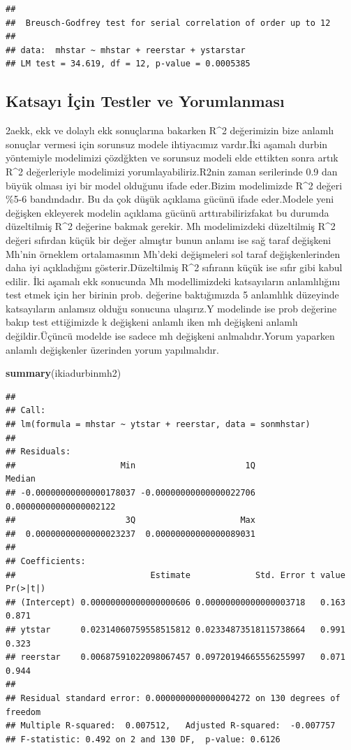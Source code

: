 \documentclass[]{article}
\newenvironment{Shaded}{\begin{snugshade}}{\end{snugshade}}
\newcommand{\KeywordTok}[1]{\textcolor[rgb]{0.13,0.29,0.53}{\textbf{#1}}}
\newcommand{\NormalTok}[1]{#1}
\begin{document}
\begin{verbatim}
## 
##  Breusch-Godfrey test for serial correlation of order up to 12
## 
## data:  mhstar ~ mhstar + reerstar + ystarstar
## LM test = 34.619, df = 12, p-value = 0.0005385
\end{verbatim}

\subsection{Katsayı İçin Testler ve
Yorumlanması}\label{katsay-icin-testler-ve-yorumlanmas}

2aekk, ekk ve dolaylı ekk sonuçlarına bakarken R\^{}2 değerimizin bize
anlamlı sonuçlar vermesi için sorunsuz modele ihtiyacımız vardır.İki
aşamalı durbin yöntemiyle modelimizi çözdğkten ve sorunsuz modeli elde
ettikten sonra artık R\^{}2 değerleriyle modelimizi
yorumlayabiliriz.R2nin zaman serilerinde 0.9 dan büyük olması iyi bir
model olduğunu ifade eder.Bizim modelimizde R\^{}2 değeri \%5-6
bandındadır. Bu da çok düşük açıklama gücünü ifade eder.Modele yeni
değişken ekleyerek modelin açıklama gücünü arttırabilirizfakat bu
durumda düzeltilmiş R\^{}2 değerine bakmak gerekir. Mh modelimizdeki
düzeltilmiş R\^{}2 değeri sıfırdan küçük bir değer almıştır bunun anlamı
ise sağ taraf değişkeni Mh'nin örneklem ortalamasının Mh'deki
değişmeleri sol taraf değişkenlerinden daha iyi açıkladığını
gösterir.Düzeltilmiş R\^{}2 sıfırann küçük ise sıfır gibi kabul edilir.
İki aşamalı ekk sonucunda Mh modellimizdeki katsayıların anlamlılığını
test etmek için her birinin prob. değerine baktığımızda 5 anlamlılık
düzeyinde katsayıların anlamsız olduğu sonucuna ulaşırız.Y modelinde ise
prob değerine bakıp test ettiğimizde k değişkeni anlamlı iken mh
değişkeni anlamlı değildir.Üçüncü modelde ise sadece mh değişkeni
anlmalıdır.Yorum yaparken anlamlı değişkenler üzerinden yorum
yapılmalıdır.

\begin{Shaded}
\begin{Highlighting}[]
\KeywordTok{summary}\NormalTok{(ikiadurbinmh2)}
\end{Highlighting}
\end{Shaded}

\begin{verbatim}
## 
## Call:
## lm(formula = mhstar ~ ytstar + reerstar, data = sonmhstar)
## 
## Residuals:
##                     Min                      1Q                  Median 
## -0.00000000000000178037 -0.00000000000000022706  0.00000000000000002122 
##                      3Q                     Max 
##  0.00000000000000023237  0.00000000000000089031 
## 
## Coefficients:
##                           Estimate             Std. Error t value Pr(>|t|)
## (Intercept) 0.00000000000000000606 0.00000000000000003718   0.163    0.871
## ytstar      0.02314060759558515812 0.02334873518115738664   0.991    0.323
## reerstar    0.00687591022098067457 0.09720194665556255997   0.071    0.944
## 
## Residual standard error: 0.0000000000000004272 on 130 degrees of freedom
## Multiple R-squared:  0.007512,   Adjusted R-squared:  -0.007757 
## F-statistic: 0.492 on 2 and 130 DF,  p-value: 0.6126
\end{verbatim}
\end{document}
